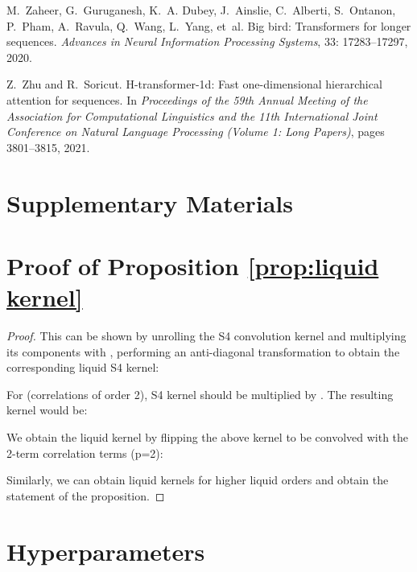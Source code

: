 \documentclass{MITcsail}
\begin{document}
\begin{thebibliography}{96}
M.~Zaheer, G.~Guruganesh, K.~A. Dubey, J.~Ainslie, C.~Alberti, S.~Ontanon,
  P.~Pham, A.~Ravula, Q.~Wang, L.~Yang, et~al.
\newblock Big bird: Transformers for longer sequences.
\newblock \emph{Advances in Neural Information Processing Systems},
  33: 17283--17297, 2020.

Z.~Zhu and R.~Soricut.
\newblock H-transformer-1d: Fast one-dimensional hierarchical attention for
  sequences.
\newblock In \emph{Proceedings of the 59th Annual Meeting of the Association
  for Computational Linguistics and the 11th International Joint Conference on
  Natural Language Processing (Volume 1: Long Papers)}, pages 3801--3815, 2021.

\end{thebibliography}




\clearpage
\beginsupplement

\section*{Supplementary Materials}

\section{Proof of Proposition \ref{prop:liquid kernel}}
\begin{proof}
This can be shown by unrolling the S4 convolution kernel and multiplying its components with , performing an anti-diagonal transformation to obtain the corresponding liquid S4 kernel:

For  (correlations of order 2), S4 kernel should be multiplied by . The resulting kernel would be:



\noindent We obtain the liquid kernel by flipping the above kernel to be convolved with the 2-term correlation terms (p=2): 



\noindent Similarly, we can obtain liquid kernels for higher liquid orders and obtain the statement of the proposition.
\end{proof}

\section{Hyperparameters}
\end{document}
